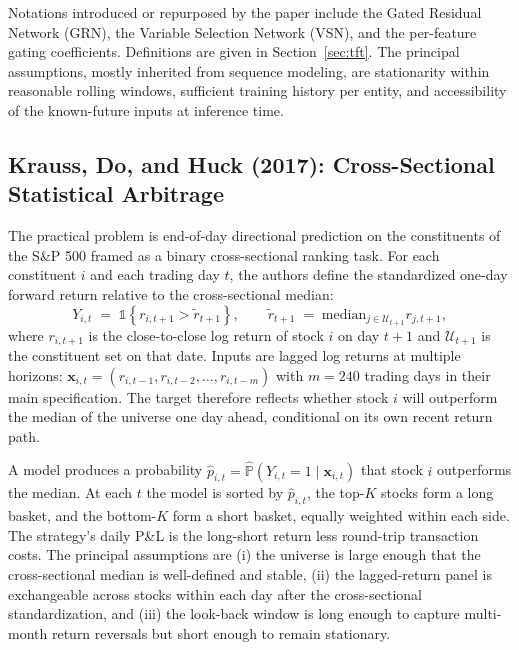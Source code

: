 \documentclass[11pt]{article}
\begin{document}
Notations introduced or repurposed by the paper include the Gated Residual Network (GRN), the Variable Selection Network (VSN), and the per-feature gating coefficients.  Definitions are given in Section~\ref{sec:tft}.  The principal assumptions, mostly inherited from sequence modeling, are stationarity within reasonable rolling windows, sufficient training history per entity, and accessibility of the known-future inputs at inference time.

\subsection{Krauss, Do, and Huck (2017): Cross-Sectional Statistical Arbitrage}

The practical problem is end-of-day directional prediction on the constituents of the S\&P 500 framed as a binary cross-sectional ranking task.  For each constituent $i$ and each trading day $t$, the authors define the standardized one-day forward return relative to the cross-sectional median:
\begin{equation}
    Y_{i,t} \;=\; \mathbb{1}\!\left\{ r_{i,t+1} > \widetilde{r}_{t+1} \right\}, \qquad
    \widetilde{r}_{t+1} \;=\; \mathrm{median}_{j \in \mathcal{U}_{t+1}} r_{j,t+1},
\end{equation}
where $r_{i,t+1}$ is the close-to-close log return of stock $i$ on day $t+1$ and $\mathcal{U}_{t+1}$ is the constituent set on that date.  Inputs are lagged log returns at multiple horizons: $\bm{x}_{i,t} = (r_{i,t-1}, r_{i,t-2}, \dots, r_{i,t-m})$ with $m = 240$ trading days in their main specification.  The target therefore reflects whether stock $i$ will outperform the median of the universe one day ahead, conditional on its own recent return path.

A model produces a probability $\hat{p}_{i,t} = \widehat{\mathbb{P}}(Y_{i,t} = 1 \mid \bm{x}_{i,t})$ that stock $i$ outperforms the median.  At each $t$ the model is sorted by $\hat{p}_{i,t}$, the top-$K$ stocks form a long basket, and the bottom-$K$ form a short basket, equally weighted within each side.  The strategy's daily P\&L is the long-short return less round-trip transaction costs.  The principal assumptions are (i) the universe is large enough that the cross-sectional median is well-defined and stable, (ii) the lagged-return panel is exchangeable across stocks within each day after the cross-sectional standardization, and (iii) the look-back window is long enough to capture multi-month return reversals but short enough to remain stationary.
\end{document}
